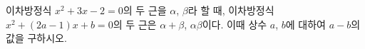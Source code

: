 이차방정식 $x^2+3x-2=0$의 두 근을 $\alpha$, $\beta$라 할 때, 이차방정식 $x^2+(2a-1)x+b=0$의 두 근은 $\alpha+\beta$, $\alpha\beta$이다. 이때 상수 $a$, $b$에 대하여 $a-b$의 값을 구하시오.
